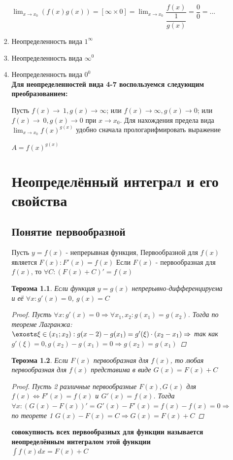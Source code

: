 \documentclass[oneside]{book}
\newtheorem{thm}{Тероэма}[chapter] %
\begin{document}
\begin{enumerate}
\begin{itemize}
\begin{enumerate}
	$\lim_{x \to x_{0}} (f(x)g(x))=
	[\infty\times 0]=
	\lim_{x \to x_{0}} \dfrac{f(x)}{\dfrac{1}{g(x)}}=
	\dfrac{0}{0}=...$

	\item Неопределенность вида $1^{\infty}$
	\item Неопределенность вида $\infty^{0}$
	\item Неопределенность вида $0^{0}$\\

	\textbf{Для неопределенностей вида 4-7 воспользуемся следующим преобразованием:}

	Пусть $f(x)\to\ 1, g(x)\to\infty$; или $f(x)\to\infty, g(x)\to 0$; или $f(x)\to\ 0, g(x)\to 0$ при $x\to x_{0}$. Для нахождения предела вида $\lim_{x\to x_{0}} f(x)^{g(x)}$ удобно сначала прологарифмировать выражение
	 \begin{center}
		$A=f(x)^{g(x)}$
	\end{center}



\setcounter{chapter}{31}
\chapter[Неопределённый интеграл]{Неопределённый интеграл и его свойства}
\section[Первообразная]{Понятие первообразной}
Пусть $y = f(x)$ - непрерывная функция, Первообразной для $f(x)$ является $F(x): F'(x) = f(x)$
Если $F(x)$ - первообразная для $f(x)$, то $\forall C: (F(x) + C)' = f(x)$
\begin{thm}
  Если функция $y = g(x)$ непрерывно-дифференцируема и её $\forall x: g'(x) = 0$, $g(x) = C$
  \begin{proof}
    Пусть $\forall x: g'(x) = 0 \Rightarrow \forall x_1, x_2: g(x_1) = g(x_2)$. Тогда по теореме Лагранжа:
    $\exosts \xi \in (x_1; x_2): g(x-2) - g(x_1) = g'(\xi)\cdot(x_2 - x_1) \Rightarrow$ так как $g'(\xi) = 0, g(x_2) - g(x_1) = 0 \Rightarrow g(x_2) = g(x_1)$
  \end{proof}
\end{thm}
\begin{thm}
  Если $F(x)$ первообразная для $f(x)$, то любая первообразная для $f(x)$ представима в виде $G(x) = F(x) + C$
  \begin{proof}
    Пусть 2 различные первообразные $F(x), G(x)$ для $f(x) \Leftrightarrow F'(x) = f(x) $ и $G'(x) = f(x)$.
    Тогда $\forall x: (G(x) - F(x))' = G'(x) - F'(x) = f(x) - f(x) = 0 \Rightarrow$ по теорете 1 $G(x) - F(x) = C \Rightarrow G(x) = F(x) + C$
  \end{proof}
\end{thm}
\textbf{совокупность всех первообразных для функции называется неопределённым интегралом этой функции $\int f(x) dx = F(x) + C$}

\end{enumerate}
\end{itemize}
\end{enumerate}
\end{document}
